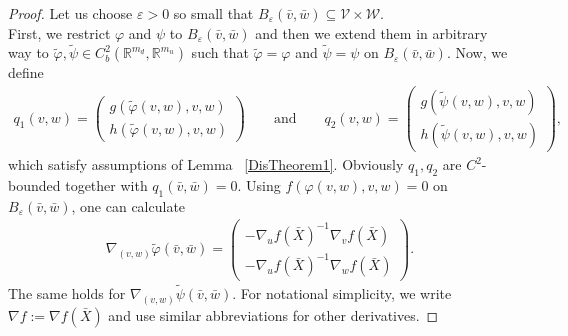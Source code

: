 \documentclass[12pt, a4paper]{amsart}
\numberwithin{equation}{section}
\newcommand{\RR}{\mathbb{R}}
\newcommand{\CSS}{\bar{X}}
\newcommand{\Cus}{\bar{\us}}
\newcommand{\Cuf}{\bar{\uf}}
\newcommand{\un}{u}
\newcommand{\us}{v}
\newcommand{\uf}{w}
\newcommand{\mn}{m_{u}}  %
\newcommand{\md}{m_{d}}  %
\newcommand{\fn}{f}
\newcommand{\fs}{g}
\newcommand{\ffa}{h}
\begin{document}
\begin{proof}%
        Let us choose $\varepsilon >0$ so small that $B_\varepsilon(\Cus, \Cuf) \subseteq \mathcal{V}\times \mathcal W$.
        \\
        First, we restrict $\varphi$ and $\psi$ to $B_\varepsilon(\Cus, \Cuf)$ and then we extend them in arbitrary way to $\tilde{\varphi}, \tilde{\psi} \in C^2_b(\RR^{\md}, \RR^{\mn})$ such that $\tilde{\varphi}= \varphi$ and $\tilde{\psi} = \psi$ on $B_\varepsilon(\Cus, \Cuf)$. Now, we define 
        \begin{align}\label{eq:def_q1_q2}
            q_1(\us,\uf) = \begin{pmatrix}    
            \fs\left( \tilde{\varphi}(\us,\uf), \us,\uf \right)    \\
            \ffa\left( \tilde{\varphi}(\us,\uf), \us,\uf \right)
            \end{pmatrix} \qquad \text{and} \qquad 
            q_2(\us,\uf) = \begin{pmatrix}    
            \fs\left( \tilde{\psi}(\us,\uf), \us,\uf \right)    \\
            \ffa\left( \tilde{\psi}(\us,\uf), \us,\uf \right)
            \end{pmatrix},
        \end{align}
        which satisfy assumptions of Lemma ~\ref{DisTheorem1}. Obviously $q_1, q_2$ are $C^2$-bounded 
        together with $q_1(\Cus, \Cuf) = 0$.
        Using $\fn(\varphi(v,w),v,w) = 0$ on $B_\varepsilon(\Cus, \Cuf)$, one can calculate 
        \begin{align}\label{eq:deriv_tilde_phi}
            \nabla_{(v,w)} \tilde\varphi(\Cus, \Cuf) =
            \begin{pmatrix}-\nabla_{\un}\fn\left(\CSS\right)^{-1} \nabla_{\us}\fn\left(\CSS\right) \\
            -\nabla_{\un}\fn\left(\CSS\right)^{-1} \nabla_{\uf}\fn\left(\CSS\right)
            \end{pmatrix}.
        \end{align}
        The same holds for $\nabla_{(\us,\uf)}\tilde{\psi}(\Cus,\Cuf)$. For notational simplicity, we write $\nabla f:= \nabla f(\CSS)$ and use similar abbreviations for other derivatives.


\end{proof}
\end{document}
